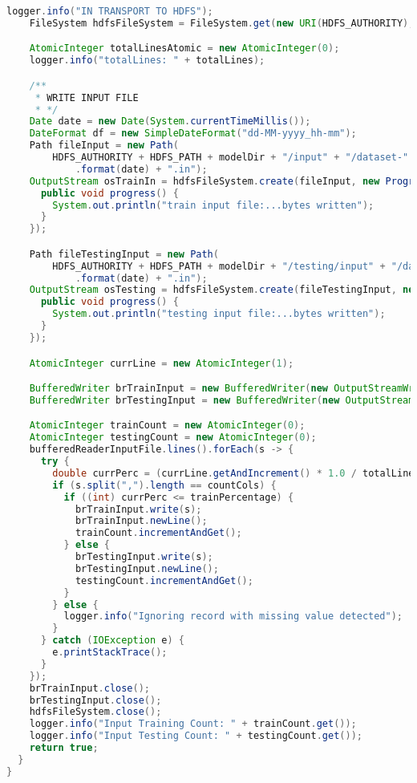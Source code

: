\begin{lstlisting}[language=Java,basicstyle=\tiny,caption=HdfsServiceImpl.java]
    logger.info("IN TRANSPORT TO HDFS");
    FileSystem hdfsFileSystem = FileSystem.get(new URI(HDFS_AUTHORITY), conf);

    AtomicInteger totalLinesAtomic = new AtomicInteger(0);
    logger.info("totalLines: " + totalLines);

    /**
     * WRITE INPUT FILE
     * */
    Date date = new Date(System.currentTimeMillis());
    DateFormat df = new SimpleDateFormat("dd-MM-yyyy_hh-mm");
    Path fileInput = new Path(
        HDFS_AUTHORITY + HDFS_PATH + modelDir + "/input" + "/dataset-" + atomic + "_" + df
            .format(date) + ".in");
    OutputStream osTrainIn = hdfsFileSystem.create(fileInput, new Progressable() {
      public void progress() {
        System.out.println("train input file:...bytes written");
      }
    });

    Path fileTestingInput = new Path(
        HDFS_AUTHORITY + HDFS_PATH + modelDir + "/testing/input" + "/dataset-" + atomic + "_" + df
            .format(date) + ".in");
    OutputStream osTesting = hdfsFileSystem.create(fileTestingInput, new Progressable() {
      public void progress() {
        System.out.println("testing input file:...bytes written");
      }
    });

    AtomicInteger currLine = new AtomicInteger(1);

    BufferedWriter brTrainInput = new BufferedWriter(new OutputStreamWriter(osTrainIn, "UTF-8"));
    BufferedWriter brTestingInput = new BufferedWriter(new OutputStreamWriter(osTesting, "UTF-8"));

    AtomicInteger trainCount = new AtomicInteger(0);
    AtomicInteger testingCount = new AtomicInteger(0);
    bufferedReaderInputFile.lines().forEach(s -> {
      try {
        double currPerc = (currLine.getAndIncrement() * 1.0 / totalLines * 1.0) * 100;
        if (s.split(",").length == countCols) {
          if ((int) currPerc <= trainPercentage) {
            brTrainInput.write(s);
            brTrainInput.newLine();
            trainCount.incrementAndGet();
          } else {
            brTestingInput.write(s);
            brTestingInput.newLine();
            testingCount.incrementAndGet();
          }
        } else {
          logger.info("Ignoring record with missing value detected");
        }
      } catch (IOException e) {
        e.printStackTrace();
      }
    });
    brTrainInput.close();
    brTestingInput.close();
    hdfsFileSystem.close();
    logger.info("Input Training Count: " + trainCount.get());
    logger.info("Input Testing Count: " + testingCount.get());
    return true;
  }
}
\end{lstlisting}

